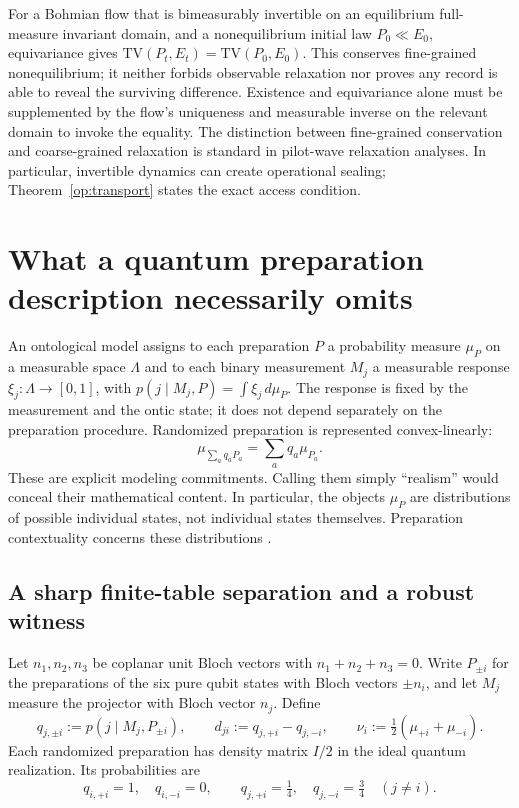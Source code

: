 \documentclass[11pt,a4paper]{article}
\theoremstyle{definition}
\theoremstyle{remark}\newtheorem{remark}[theorem]{Remark}
\newcommand{\TV}{\mathrm{TV}}
\begin{document}
For a Bohmian flow that is bimeasurably invertible on an equilibrium
full-measure invariant domain, and a nonequilibrium initial law
$P_0\ll E_0$, equivariance gives
$\TV(P_t,E_t)=\TV(P_0,E_0)$. This conserves fine-grained nonequilibrium;
it neither forbids observable relaxation nor proves any record is able
to reveal the surviving difference. Existence and equivariance alone
must be supplemented by the flow's uniqueness and measurable inverse
on the relevant domain to invoke the equality. The distinction between
fine-grained conservation and coarse-grained relaxation is standard in
pilot-wave relaxation analyses. In particular, invertible dynamics can create operational sealing; Theorem~\ref{op:transport} states the exact access condition.


\section{What a quantum preparation description necessarily omits}
\label{ctx:section}

An ontological model assigns to each preparation $P$ a probability measure
$\mu_P$ on a measurable space $\Lambda$ and to each binary measurement $M_j$
a measurable response $\xi_j:\Lambda\to[0,1]$, with
$p(j\mid M_j,P)=\int\xi_j\,d\mu_P$.
The response is fixed by the measurement and the ontic state; it does not
depend separately on the preparation procedure. Randomized preparation is
represented convex-linearly:
\[
 \mu_{\sum_a q_aP_a}=\sum_aq_a\mu_{P_a}.
\]
These are explicit modeling commitments. Calling them simply ``realism''
would conceal their mathematical content. In particular, the objects
$\mu_P$ are distributions of possible individual states, not individual
states themselves. Preparation contextuality concerns these distributions
\cite{S05,Marvian20}.

\subsection{A sharp finite-table separation and a robust witness}

Let $n_1,n_2,n_3$ be coplanar unit Bloch vectors with
$n_1+n_2+n_3=0$. Write $P_{\pm i}$ for the preparations of the six pure
qubit states with Bloch vectors $\pm n_i$, and let $M_j$ measure the
projector with Bloch vector $n_j$. Define
\[
 q_{j,\pm i}:=p(j\mid M_j,P_{\pm i}),\qquad
 d_{ji}:=q_{j,+i}-q_{j,-i},\qquad
 \nu_i:=\tfrac12(\mu_{+i}+\mu_{-i}).
\]
Each randomized preparation has density matrix $I/2$ in the ideal quantum
realization. Its probabilities are
\begin{equation}\label{ctx:table}
 q_{i,+i}=1,\quad q_{i,-i}=0,\qquad
 q_{j,+i}=\tfrac14,\quad q_{j,-i}=\tfrac34\quad(j\ne i).
\end{equation}
\end{document}
